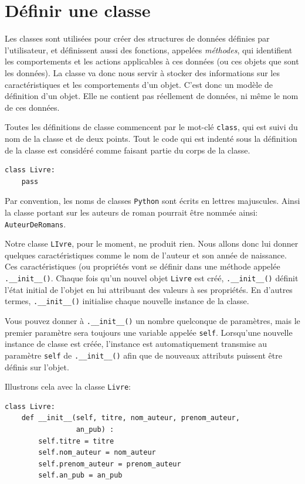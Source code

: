 \documentclass[a4paper,12pt]{book}
\begin{document}
\section{Définir une classe}
Les classes sont utilisées pour créer des structures de données définies par l'utilisateur, et définissent aussi des fonctions, appelées \textit{méthodes}, qui identifient les comportements et les actions applicables à ces données (ou ces objets que sont les données). La classe va donc nous servir à stocker des informations sur les caractéristiques et les comportements d'un objet. C'est donc un modèle de définition d'un objet. Elle ne contient pas réellement de données, ni même le nom de ces données.
\medskip

Toutes les définitions de classe commencent par le mot-clé \texttt{class}, qui est suivi du nom de la classe et de deux points. Tout le code qui est indenté sous la définition de la classe est considéré comme faisant partie du corps de la classe.
\begin{lstlisting}[caption=Définition d'une classe]
class Livre:
    pass
\end{lstlisting}
\medskip

Par convention, les noms de classes \texttt{Python} sont écrits en lettres majuscules. Ainsi la classe portant sur les auteurs de roman pourrait être nommée ainsi: \texttt{AuteurDeRomans}.
\medskip

Notre classe \texttt{LIvre}, pour le moment, ne produit rien. Nous allons donc lui donner quelques caractéristiques comme le nom de l'auteur et son année de naissance. Ces caractéristiques (ou propriétés vont se définir dans une méthode appelée \texttt{.\_\_init\_\_()}. Chaque fois qu'un nouvel objet \texttt{Livre} est créé, \texttt{.\_\_init\_\_()} définit l'état initial de l'objet en lui attribuant des valeurs à ses propriétés. En d'autres termes, \texttt{.\_\_init\_\_()} initialise chaque nouvelle instance de la classe.
\medskip

Vous pouvez donner à \texttt{.\_\_init\_\_()} un nombre quelconque de paramètres, mais le premier paramètre sera toujours une variable appelée \texttt{self}. Lorsqu'une nouvelle instance de classe est créée, l'instance est automatiquement transmise au paramètre \texttt{self} de \texttt{.\_\_init\_\_()} afin que de nouveaux attributs puissent être définis sur l'objet.
\medskip

Illustrons cela avec la classe \texttt{Livre}:
\begin{lstlisting}[caption=Initialisation avec la méthode \texttt{.\_\_init\_\_()}]
class Livre:
    def __init__(self, titre, nom_auteur, prenom_auteur, 
                 an_pub) :
		self.titre = titre
		self.nom_auteur = nom_auteur
		self.prenom_auteur = prenom_auteur
		self.an_pub = an_pub
\end{lstlisting}
\medskip
\end{document}
